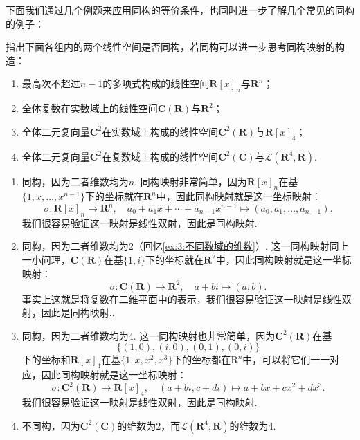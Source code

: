 下面我们通过几个例题来应用同构的等价条件，也同时进一步了解几个常见的同构的例子：
\begin{example}
    指出下面各组内的两个线性空间是否同构，若同构可以进一步思考同构映射的构造：
    \begin{enumerate}
        \item 最高次不超过$n-1$的多项式构成的线性空间$\mathbf{R}[x]_n$与$\mathbf{R}^n$；

        \item 全体复数在实数域上的线性空间$\mathbf{C}(\mathbf{R})$与$\mathbf{R}^2$；

        \item 全体二元复向量$\mathbf{C}^2$在实数域上构成的线性空间$\mathbf{C}^2(\mathbf{R})$与$\mathbf{R}[x]_4$；

        \item 全体二元复向量$\mathbf{C}^2$在复数域上构成的线性空间$\mathbf{C}^2(\mathbf{C})$与$\mathcal{L}(\mathbf{R}^4,\mathbf{R})$.
    \end{enumerate}
\end{example}

\begin{solution}
    \begin{enumerate}
        \item 同构，因为二者维数均为$n$. 同构映射非常简单，因为$\mathbf{R}[x]_n$在基$\{1,x,\ldots,x^{n-1}\}$下的坐标就在$\mathbf{R}^n$中，因此同构映射就是这一坐标映射：
              \[\sigma:\mathbf{R}[x]_n\to\mathbf{R}^n,\quad a_0+a_1x+\cdots+a_{n-1}x^{n-1}\mapsto(a_0,a_1,\ldots,a_{n-1}).\]
              我们很容易验证这一映射是线性双射，因此是同构映射.

        \item 同构，因为二者维数均为2（回忆\autoref{ex:3:不同数域的维数}）. 这一同构映射同上一小问理，$\mathbf{C}(\mathbf{R})$在基$\{1,i\}$下的坐标就在$\mathbf{R}^2$中，因此同构映射就是这一坐标映射：
              \[\sigma:\mathbf{C}(\mathbf{R})\to\mathbf{R}^2,\quad a+bi\mapsto(a,b).\]
              事实上这就是将复数在二维平面中的表示，我们很容易验证这一映射是线性双射，因此是同构映射..

        \item 同构，因为二者维数均为4. 这一同构映射也非常简单，因为$\mathbf{C}^2(\mathbf{R})$在基
              \[\{(1,0),(i,0),(0,1),(0,i)\}\]
              下的坐标和$\mathbf{R}[x]_4$在基$\{1,x,x^2,x^3\}$下的坐标都在$\mathrm{R}^n$中，可以将它们一一对应，因此同构映射就是这一坐标映射：
              \[\sigma:\mathbf{C}^2(\mathbf{R})\to\mathbf{R}[x]_4,\quad (a+bi,c+di)\mapsto a+bx+cx^2+dx^3.\]
              我们很容易验证这一映射是线性双射，因此是同构映射.

        \item 不同构，因为$\mathbf{C}^2(\mathbf{C})$的维数为2，而$\mathcal{L}(\mathbf{R}^4,\mathbf{R})$的维数为4.
    \end{enumerate}
\end{solution}

